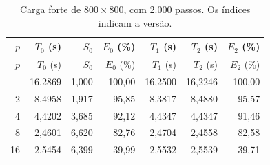 \begin{longtable}{rrrrrrr}
\caption{Carga forte de $800\times800$, com 2.000 passos. Os índices indicam a versão.}\label{tab:forte}\\
\toprule $p$ & $T_0$ (s) & $S_0$ & $E_0$ (\%) & $T_1$ (s) & $T_2$ (s) & $E_2$ (\%)\\
\midrule\endfirsthead
\toprule $p$ & $T_0$ (s) & $S_0$ & $E_0$ (\%) & $T_1$ (s) & $T_2$ (s) & $E_2$ (\%)\\
\midrule\endhead
\bottomrule\endfoot
1 & 16,2869 & 1,000 & 100,00 & 16,2500 & 16,2246 & 100,00\\
2 & 8,4958 & 1,917 & 95,85 & 8,3817 & 8,4880 & 95,57\\
4 & 4,4202 & 3,685 & 92,12 & 4,4347 & 4,4347 & 91,46\\
8 & 2,4601 & 6,620 & 82,76 & 2,4704 & 2,4558 & 82,58\\
16 & 2,5454 & 6,399 & 39,99 & 2,5532 & 2,5539 & 39,71\\
\end{longtable}
